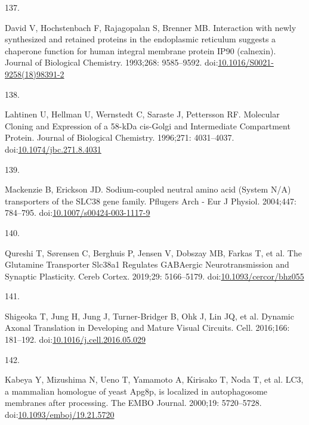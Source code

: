 \documentclass[
  12pt,
  a4paper,
]{book}
\newlength{\cslhangindent}
\newlength{\csllabelwidth}
\newlength{\cslentryspacingunit} %
\newenvironment{CSLReferences}[2] %
 {%
  \setlength{\parindent}{0pt}
  \ifodd #1
  \let\oldpar\par
  \def\par{\hangindent=\cslhangindent\oldpar}
  \fi
  \setlength{\parskip}{#2\cslentryspacingunit}
 }%
 {}
\newcommand{\CSLLeftMargin}[1]{\parbox[t]{\csllabelwidth}{#1}}
\newcommand{\CSLRightInline}[1]{\parbox[t]{\linewidth - \csllabelwidth}{#1}\break}
\begin{document}
\begin{CSLReferences}{0}{0}
\leavevmode{}%
\CSLLeftMargin{137. }%
\CSLRightInline{David V, Hochstenbach F, Rajagopalan S, Brenner MB. Interaction with newly synthesized and retained proteins in the endoplasmic reticulum suggests a chaperone function for human integral membrane protein {IP90} (calnexin). Journal of Biological Chemistry. 1993;268: 9585--9592. doi:\href{https://doi.org/10.1016/S0021-9258(18)98391-2}{10.1016/S0021-9258(18)98391-2}}

\leavevmode{}%
\CSLLeftMargin{138. }%
\CSLRightInline{Lahtinen U, Hellman U, Wernstedt C, Saraste J, Pettersson RF. Molecular {Cloning} and {Expression} of a 58-{kDa} cis-{Golgi} and {Intermediate Compartment Protein}. Journal of Biological Chemistry. 1996;271: 4031--4037. doi:\href{https://doi.org/10.1074/jbc.271.8.4031}{10.1074/jbc.271.8.4031}}

\leavevmode{}%
\CSLLeftMargin{139. }%
\CSLRightInline{Mackenzie B, Erickson JD. Sodium-coupled neutral amino acid ({System N}/{A}) transporters of the {SLC38} gene family. Pflugers Arch - Eur J Physiol. 2004;447: 784--795. doi:\href{https://doi.org/10.1007/s00424-003-1117-9}{10.1007/s00424-003-1117-9}}

\leavevmode{}%
\CSLLeftMargin{140. }%
\CSLRightInline{Qureshi T, Sørensen C, Berghuis P, Jensen V, Dobszay MB, Farkas T, et al. The {Glutamine Transporter Slc38a1 Regulates GABAergic Neurotransmission} and {Synaptic Plasticity}. Cereb Cortex. 2019;29: 5166--5179. doi:\href{https://doi.org/10.1093/cercor/bhz055}{10.1093/cercor/bhz055}}

\leavevmode{}%
\CSLLeftMargin{141. }%
\CSLRightInline{Shigeoka T, Jung H, Jung J, Turner-Bridger B, Ohk J, Lin JQ, et al. Dynamic {Axonal Translation} in {Developing} and {Mature Visual Circuits}. Cell. 2016;166: 181--192. doi:\href{https://doi.org/10.1016/j.cell.2016.05.029}{10.1016/j.cell.2016.05.029}}

\leavevmode{}%
\CSLLeftMargin{142. }%
\CSLRightInline{Kabeya Y, Mizushima N, Ueno T, Yamamoto A, Kirisako T, Noda T, et al. {LC3}, a mammalian homologue of yeast {Apg8p}, is localized in autophagosome membranes after processing. The EMBO Journal. 2000;19: 5720--5728. doi:\href{https://doi.org/10.1093/emboj/19.21.5720}{10.1093/emboj/19.21.5720}}


\end{CSLReferences}
\end{document}
